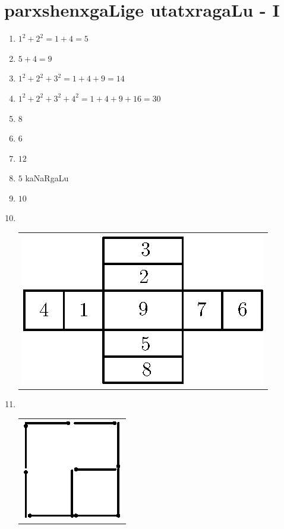 \chapter{parxshenxgaLige utatxragaLu - {\rm I}}

\begin{enumerate}
  \renewcommand{\labelenumi}{\rm(\theenumi)}
    \itemsep=2pt
\item $1^2+ 2^2 = 1+4=5$

\item $5+4=9$

\item $1^2+2^2+3^2 = 1+4+9 =14$

\item $1^2 + 2^2 + 3^2+4^2 = 1+4+9+16 = 30$

\item $8$

\item $6$

\item $12$

\item $5$ kaNaRgaLu

\item $10$

\item
  ~

  \vskip -0.4cm
  
  \begin{tabular}[t]{l}
 \includegraphics{src/figures/ans10.eps}
\end{tabular}

  \newpage

\item 
~

  \vskip -0.6cm
  \begin{tabular}[t]{c}
\centering
\includegraphics{src/figures/ans11.eps}
\end{tabular}
\smallskip


\end{enumerate}
